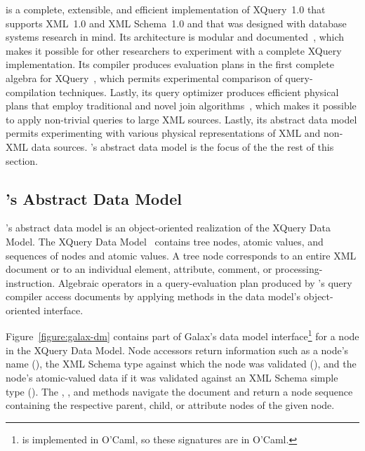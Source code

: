 \Galax{} is a complete,
extensible, and efficient implementation of XQuery~1.0 that supports
XML~1.0 and XML Schema~1.0 and that was designed with database systems
research in mind.  Its architecture is modular and
documented~\cite{galax:edbt2004}, which makes it possible for other
researchers to experiment with a complete XQuery implementation.  Its
compiler produces evaluation plans in the first complete algebra
for XQuery~\cite{galax:icde2006}, which permits experimental
comparison of query-compilation techniques.  Lastly, its query
optimizer produces efficient physical plans that employ traditional
and novel join algorithms~\cite{galax:icde2006}, which makes it
possible to apply non-trivial queries to large XML sources.  Lastly,
its abstract data model permits experimenting with various physical
representations of XML and non-XML data sources.  \Galax{}'s abstract
data model is the focus of the the rest of this section.

\subsection{\Galax{}'s Abstract Data Model}

\Galax{}'s abstract data model is an object-oriented realization of
the XQuery Data Model.  The XQuery Data Model~\cite{XPath:DataModel}
contains tree nodes, atomic values, and sequences of nodes and atomic
values.  A tree node corresponds to an entire XML document or to an
individual element, attribute, comment, or processing-instruction.
Algebraic operators in a query-evaluation plan produced by \Galax{}'s
query compiler access documents by applying methods in the data
model's object-oriented interface.

Figure~\ref{figure:galax-dm} contains part of Galax's data model
interface\footnote{\Galax{} is implemented in O'Caml, so these signatures
are in O'Caml.} for a node in the XQuery Data Model.  Node
accessors return information such as a node's name (),
the XML Schema type against which the node was validated (),
and the node's atomic-valued data if it was validated against an XML
Schema simple type ().  The , ,
and  methods navigate the document and return a node
sequence containing the respective parent, child, or attribute nodes
of the given node.

